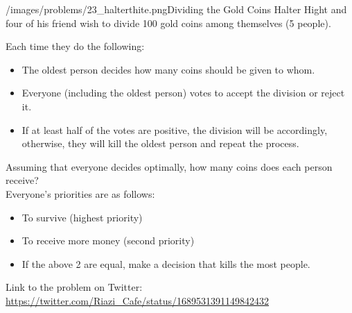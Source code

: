 \begin{problem}{/images/problems/23_halterthite.png}{Dividing the Gold Coins}
Halter Hight and four of his friend wish to divide 100 gold coins among themselves (5 people).

Each time they do the following:
\begin{itemize}
\item The oldest person decides how many coins should be given to whom.
\item Everyone (including the oldest person) votes to accept the division or reject it.
\item If at least half of the votes are positive, the division will be accordingly, otherwise, they will kill the oldest person and repeat the process.
\end{itemize}
Assuming that everyone decides optimally, how many coins does each person receive?\\[0.2cm]

Everyone's priorities are as follows:
\begin{itemize}
\item To survive (highest priority)
\item To receive more money (second priority)
\item If the above 2 are equal, make a decision that kills the most people.
\end{itemize}

Link to the problem on Twitter:  \url{https://twitter.com/Riazi_Cafe/status/1689531391149842432}
\end{problem}
